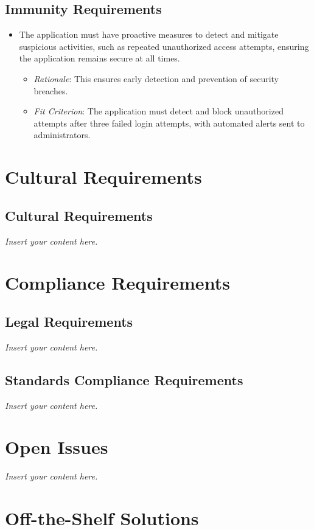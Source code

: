 \documentclass[12pt]{article}
\newcommand{\lips}{\textit{Insert your content here.}}
\begin{document}
\subsection{Immunity Requirements}
\begin{itemize}
    \item The application must have proactive measures to detect and mitigate
    suspicious activities, such as repeated unauthorized access attempts,
    ensuring the application remains secure at all times.
    \begin{itemize}
        \item \textit{Rationale}: This ensures early detection and prevention of
        security breaches.
        \item \textit{Fit Criterion}: The application must detect and block
        unauthorized attempts after three failed login attempts, with automated
        alerts sent to administrators.
    \end{itemize}
\end{itemize}

\section{Cultural Requirements}
\subsection{Cultural Requirements}
\lips

\section{Compliance Requirements}
\subsection{Legal Requirements}
\lips
\subsection{Standards Compliance Requirements}
\lips

\section{Open Issues}
\lips

\section{Off-the-Shelf Solutions}
\end{document}
